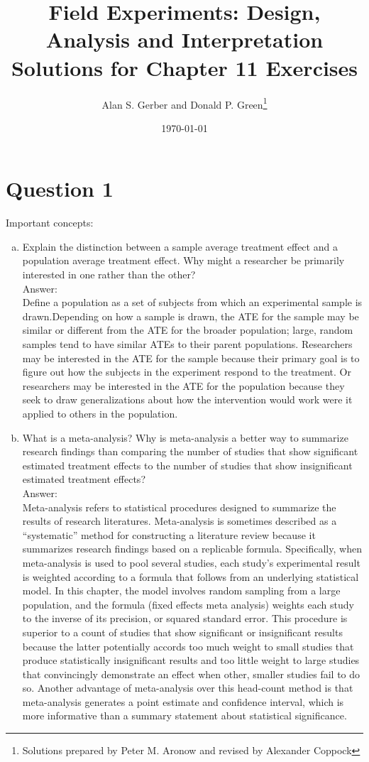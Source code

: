 \documentclass[11pt,notitlepage]{article}\usepackage[]{graphicx}\usepackage[]{color}
\title{Field Experiments: Design, Analysis and Interpretation \\
Solutions for Chapter 11 Exercises}
\author{Alan S. Gerber and Donald P. Green\footnote{Solutions prepared by Peter M. Aronow and revised by Alexander Coppock}}
\date{\today}
\begin{document}
\maketitle


\section*{Question 1}
Important concepts:
\begin{enumerate}[a)]
\item Explain the distinction between a sample average treatment effect and a population average treatment effect. Why might a researcher be primarily interested in one rather than the other? \\
Answer:\\
Define a population as a set of subjects from which an experimental sample is drawn.Depending on how a sample is drawn, the ATE for the sample may be similar or different from the ATE for the broader population; large, random samples tend to have similar ATEs to their parent populations. Researchers may be interested in the ATE for the sample because their primary goal is to figure out how the subjects in the experiment respond to the treatment. Or researchers may be interested in the ATE for the population because they seek to draw generalizations about how the intervention would work were it applied to others in the population. 

\item What is a meta-analysis? Why is meta-analysis a better way to summarize research findings than comparing the number of studies that show significant estimated treatment effects to the number of studies that show insignificant estimated treatment effects?\\
Answer:\\
Meta-analysis refers to statistical procedures designed to summarize the results of research literatures. Meta-analysis is sometimes described as a ``systematic'' method for constructing a literature review because it summarizes research findings based on a replicable formula. Specifically, when meta-analysis is used to pool several studies, each study's experimental result is weighted according to a formula that follows from an underlying statistical model. In this chapter, the model involves random sampling from a large population, and the formula (fixed effects meta analysis) weights each study to the inverse of its precision, or squared standard error. This procedure is superior to a count of studies that show significant or insignificant results because the latter potentially accords too much weight to small studies that produce statistically insignificant results and too little weight to large studies that convincingly demonstrate an effect when other, smaller studies fail to do so. Another advantage of meta-analysis over this head-count method is that meta-analysis generates a point estimate and confidence interval, which is more informative than a summary statement about statistical significance. 


\end{enumerate}
\end{document}
